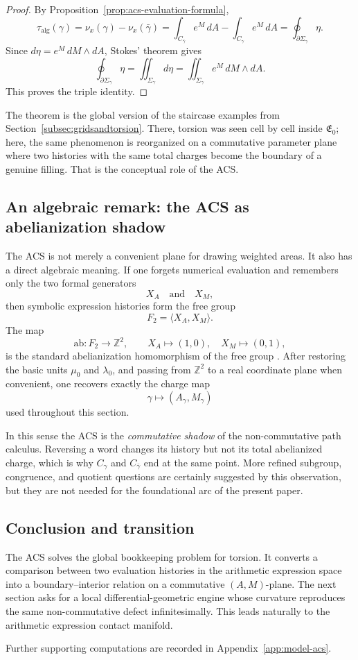 \begin{proof}
By Proposition~\ref{prop:acs-evaluation-formula},
\[
    \tau_{\mathrm{alg}}(\gamma)
    =\nu_x(\gamma)-\nu_x(\bar\gamma)
    =\int_{C_{\bar\gamma}} e^M\,dA - \int_{C_\gamma} e^M\,dA
    =\oint_{\partial\Sigma_\gamma}\eta.
\]
Since $d\eta=e^M\,dM\wedge dA$, Stokes' theorem gives
\[
    \oint_{\partial\Sigma_\gamma}\eta=\iint_{\Sigma_\gamma} d\eta
    =\iint_{\Sigma_\gamma} e^M\,dM\wedge dA.
\]
This proves the triple identity.
\end{proof}

The theorem is the global version of the staircase examples from Section~\ref{subsec:gridsandtorsion}. There, torsion was seen cell by cell inside $\mathfrak{E}_0$; here, the same phenomenon is reorganized on a commutative parameter plane where two histories with the same total charges become the boundary of a genuine filling. That is the conceptual role of the ACS.

\subsection{An algebraic remark: the ACS as abelianization shadow}
\label{sec:acs_algebraic_significance_revised_AM_lc}

The ACS is not merely a convenient plane for drawing weighted areas. It also has a direct algebraic meaning. If one forgets numerical evaluation and remembers only the two formal generators
\[
    X_A \quad\text{and}\quad X_M,
\]
then symbolic expression histories form the free group
\[
    F_2=\langle X_A,X_M\rangle.
\]
The map
\[
    \mathrm{ab}:F_2\longrightarrow \mathbb Z^2,
    \qquad
    X_A\longmapsto (1,0),\quad X_M\longmapsto (0,1),
\]
is the standard abelianization homomorphism of the free group \cite{LyndonSchupp1977Combinatorial}. After restoring the basic units $\mu_0$ and $\lambda_0$, and passing from $\mathbb Z^2$ to a real coordinate plane when convenient, one recovers exactly the charge map
\[
    \gamma\longmapsto (A_\gamma,M_\gamma)
\]
used throughout this section.

In this sense the ACS is the \emph{commutative shadow} of the non-commutative path calculus. Reversing a word changes its history but not its total abelianized charge, which is why $C_\gamma$ and $C_{\bar\gamma}$ end at the same point. More refined subgroup, congruence, and quotient questions are certainly suggested by this observation, but they are not needed for the foundational arc of the present paper.

\subsection{Conclusion and transition}

The ACS solves the global bookkeeping problem for torsion. It converts a comparison between two evaluation histories in the arithmetic expression space into a boundary--interior relation on a commutative $(A,M)$-plane. The next section asks for a local differential-geometric engine whose curvature reproduces the same non-commutative defect infinitesimally. This leads naturally to the arithmetic expression contact manifold.

Further supporting computations are recorded in Appendix~\ref{app:model-acs}.
